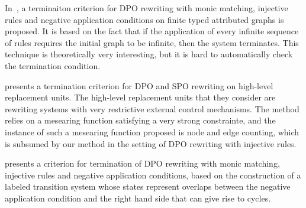 In~\cite{LEVENDOVSZKY200787}, a terminaiton criterion for DPO rewriting with monic matching, injective rules and negative application conditions on finite typed attributed graphs is proposed. It is based on the fact that if the application of every infinite sequence of rules requires the initial graph to be infinite, then the system terminates. This technique is theoretically very interesting, but it is hard to automatically check the termination condition.

\cite{bottoni2005termination} presents a termination criterion for DPO and SPO rewriting on high-level replacement units. The high-level replacement units that they consider are rewriting systems with very restrictive external control mechanisms. The method relies on a mesearing function satisfying a very strong constrainte, and the instance of such a mesearing function proposed is node and edge counting, which is subsumed by our method in the setting of DPO rewriting with injective rules.

\cite{Bottoni2010_termination} presents a criterion for termination of DPO rewriting with monic matching, injective rules and negative application conditions, based on the construction of a labeled transition system whose states represent overlaps between the negative application condition and the right hand side that can give rise to cycles.


